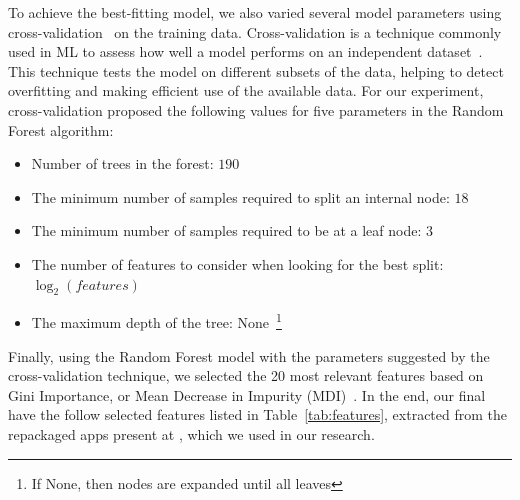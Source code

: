 To achieve the best-fitting model, we also varied several model parameters using cross-validation~\cite{DBLP:phd/us/Stephenson22} on the training data. Cross-validation is a technique commonly used in ML to assess how well a model performs on an independent dataset~\cite{DBLP:journals/jsan/AwadF23}. This technique tests the model on different subsets of the data, helping to detect overfitting and making efficient use of the available data. For our experiment, cross-validation proposed the following values for five parameters in the Random Forest algorithm:

\begin{itemize}
    \item Number of trees in the forest: $190$
    \item The minimum number of samples required to split an internal node: $18$
    \item The minimum number of samples required to be at a leaf node: $3$
    \item The number of features to consider when looking for the best split: $\log_2(features)$
    \item The maximum depth of the tree: None~\footnote{If None, then nodes are expanded until all leaves}
\end{itemize}

Finally, using the Random Forest model with the parameters suggested by the cross-validation technique, we selected the 20 most relevant features based on Gini Importance, or Mean Decrease in Impurity (MDI)~\cite{james2023introduction}. In the end, our final \fds have the follow selected features listed in Table~\ref{tab:features}, extracted from the repackaged apps present at \cds, which we used in our research. 




